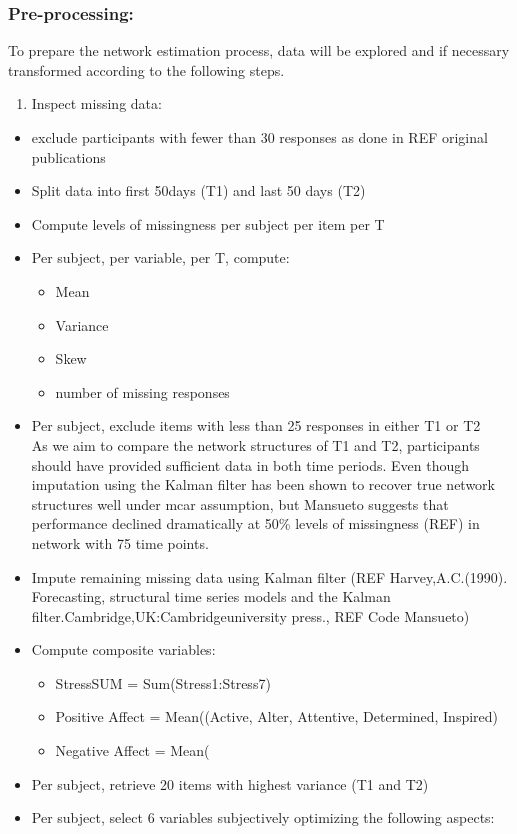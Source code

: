 \documentclass[
  english,
  man]{apa6}
\providecommand{\tightlist}{%
  \setlength{\itemsep}{0pt}\setlength{\parskip}{0pt}}
\begin{document}
\hypertarget{pre-processing}{%
\subsubsection{Pre-processing:}\label{pre-processing}}

To prepare the network estimation process, data will be explored and if necessary transformed according to the following steps.

\begin{enumerate}
\def\labelenumi{\arabic{enumi})}
\tightlist
\item
  Inspect missing data:
\end{enumerate}

\begin{itemize}
\item
  exclude participants with fewer than 30 responses as done in REF original publications
\item
  Split data into first 50days (T1) and last 50 days (T2)
\item
  Compute levels of missingness per subject per item per T
\item
  Per subject, per variable, per T, compute:

  \begin{itemize}
  \item
    Mean
  \item
    Variance
  \item
    Skew
  \item
    number of missing responses
  \end{itemize}
\item
  Per subject, exclude items with less than 25 responses in either T1 or T2\\
  As we aim to compare the network structures of T1 and T2, participants should have provided sufficient data in both time periods. Even though imputation using the Kalman filter has been shown to recover true network structures well under mcar assumption, but Mansueto suggests that performance declined dramatically at 50\% levels of missingness (REF) in network with 75 time points.
\item
  Impute remaining missing data using Kalman filter (REF Harvey,A.C.(1990). Forecasting, structural time series models and the Kalman filter.Cambridge,UK:Cambridgeuniversity press., REF Code Mansueto)
\item
  Compute composite variables:

  \begin{itemize}
  \item
    StressSUM = Sum(Stress1:Stress7)
  \item
    Positive Affect = Mean((Active, Alter, Attentive, Determined, Inspired)
  \item
    Negative Affect = Mean(
  \end{itemize}
\item
  Per subject, retrieve 20 items with highest variance (T1 and T2)
\item
  Per subject, select 6 variables subjectively optimizing the following aspects:


\end{itemize}
\end{document}
